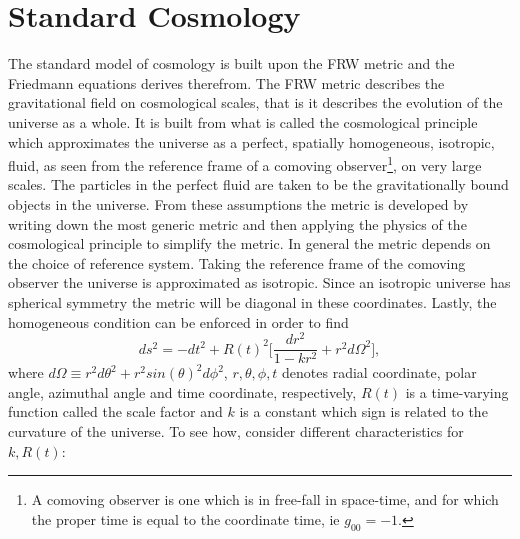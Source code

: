 \section{Standard Cosmology}
\label{SC}
The standard model of cosmology is built upon the FRW metric and the Friedmann equations derives therefrom. The FRW metric describes the gravitational field on cosmological scales, that is it describes the evolution of the universe as a whole. It is built from what is called the cosmological principle which approximates the universe as a perfect, spatially homogeneous, isotropic, fluid, as seen from the reference frame of a comoving observer\footnote{A comoving observer is one which is in free-fall in space-time, and for which the proper time is equal to the coordinate time, ie $g_{00}=-1$.}, on very large scales. The particles in the perfect fluid are taken to be the gravitationally bound objects in the universe. From these assumptions the metric is developed by writing down the most generic metric and then applying the physics of the cosmological principle to simplify the metric. \newline 
In general the metric depends on the choice of reference system. Taking the reference frame of the comoving observer the universe is approximated as isotropic. Since an isotropic universe has spherical symmetry the metric will be diagonal in these coordinates. Lastly, the homogeneous condition can be enforced in order to find~\citep{Weinberg1972}
\begin{equation}
	ds^2=-dt^2+R(t)^2\bigg[\frac{dr^2}{1-kr^2}+r^2d\Omega^2\bigg],
	\label{FRW}
\end{equation}  
where $d\Omega\equiv r^2d\theta^2+r^2sin(\theta)^2d\phi^2$, $r,\theta,\phi, t$ denotes radial coordinate, polar angle, azimuthal angle and time coordinate, respectively, $R(t)$ is a time-varying function called the scale factor and $k$ is a constant which sign is related to the curvature of the universe. To see how, consider different characteristics for $k, R(t)$:
